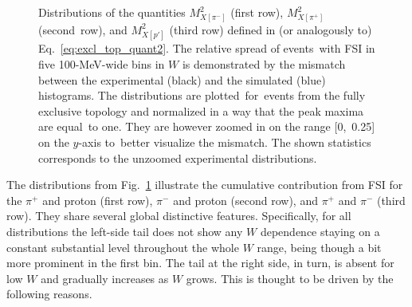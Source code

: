\begin{figure}[!ht]
\begin{center}
\end{center}
\caption{\small Distributions of the quantities $M^{2}_{X[\pi^{-}]}$ (first row), $M^{2}_{X[\pi^{+}]}$ (second~row), and $M^{2}_{X[p']}$ (third row) defined in (or analogously to) Eq.~\eqref{eq:excl_top_quant2}. The relative spread of events~with FSI in five 100-MeV-wide bins in $W$ is demonstrated by the mismatch between the experimental (black) and the simulated (blue) histograms. The distributions are plotted~for~events from the fully exclusive topology and normalized in a way that the peak maxima are equal~to one. They are however zoomed in on the range [0,~0.25] on the $y$-axis to~better visualize the mismatch. The shown statistics corresponds to the unzoomed experimental distributions.}
\label{fig:all_mass}
\end{figure}

The distributions from Fig.~\ref{fig:all_mass} illustrate the cumulative contribution from FSI for the $\pi^{+}$ and proton (first row), $\pi^{-}$ and proton (second row), and $\pi^{+}$ and $\pi^{-}$ (third row). They share several global distinctive features. Specifically, for all distributions the left-side tail does not show any $W$ dependence staying on a constant substantial level throughout the whole $W$ range, being though a bit more prominent in the first bin. The tail at the right side, in turn, is absent for low $W$ and gradually increases as $W$ grows. This is thought to be driven by the following reasons. 


